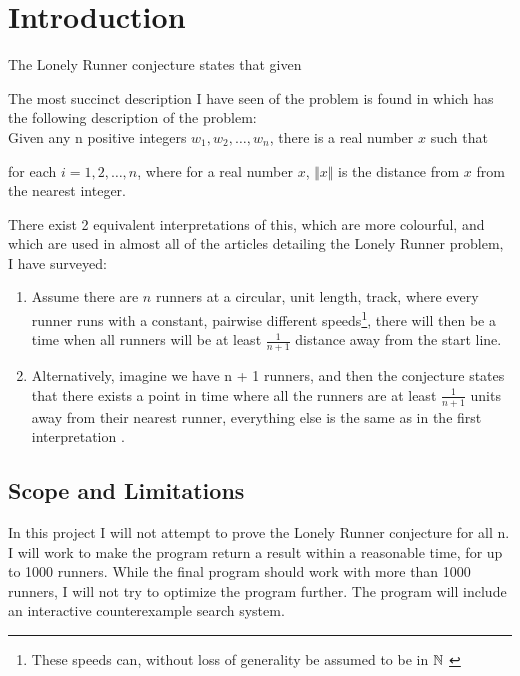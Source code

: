 \section{Introduction}
\label{introduction}

The Lonely Runner conjecture states that given 

The most succinct description I have seen of the problem is found in \cite{ANote} which has the following description of the problem:\\

Given any n positive integers $w_1, w_2, \ldots, w_n$, there is a real number $x$ such that 

for each $i = 1, 2, \ldots, n$, where for a real number $x$, $\Vert x \Vert$ is the distance from $x$ from the nearest integer.

There exist 2 equivalent interpretations of this, which are more colourful, and which are used in almost all of the articles detailing the Lonely Runner problem, I have surveyed:
\begin{enumerate}
\item Assume there are $n$ runners at a circular, unit length, track, where every runner runs with a constant, pairwise different speeds\footnote{These speeds can, without loss of generality be assumed to be in $\mathbb{N}$ \cite{Bienia97flows.view-obstructions}}, there will then be a time when all runners will be at least $\frac{1}{n + 1}$ distance away from the start line.\\

\item Alternatively, imagine we have n + 1 runners, and then the conjecture states that there exists a point in time where all the runners are at least $\frac{1}{n + 1}$ units away from their nearest runner, everything else is the same as in the first interpretation \cite{Bienia97flows.view-obstructions}.\\
\end{enumerate}

\subsection{Scope and Limitations}
\label{scope}
In this project I will not attempt to prove the Lonely Runner conjecture for all n. 
I will work to make the program return a result within a reasonable time, for up to 1000 runners. While the final program should work with more than 1000 runners, I will not try to optimize the program further. The program will include an interactive counterexample search system.

